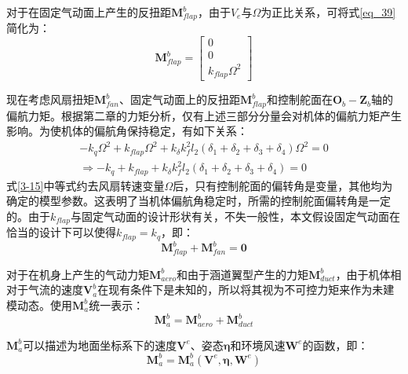 对于在固定气动面上产生的反扭距$\boldsymbol{M}_{flap}^b$，由于$V_{e}$与$\Omega$为正比关系，可将式\ref{eq_39}简化为：
\begin{equation}
    \boldsymbol{M}_{flap}^b=
    \begin{bmatrix}
    0 \\0 \\k_{flap}\Omega^2
    \end{bmatrix}
    \label{3-15}
\end{equation}

现在考虑风扇扭矩$\boldsymbol{M}_{fan}^b$、固定气动面上的反扭距$\boldsymbol{M}_{flap}^b$和控制舵面在$\boldsymbol{O}_b-\boldsymbol{Z}_b$轴的偏航力矩。根据第二章的力矩分析，仅有上述三部分分量会对机体的偏航力矩产生影响。为使机体的偏航角保持稳定，有如下关系：
\begin{equation}
    \begin{gathered}
    -k_q\Omega^2+k_{flap}\Omega^2+k_{\delta}k_f^2 l_2(\delta_1 + \delta_2 + \delta_3 + \delta_4)\Omega^2=0
     \\
     \Rightarrow
    -k_q+k_{flap}+k_{\delta}k_f^2 l_2(\delta_1 + \delta_2 + \delta_3 + \delta_4)=0
    \end{gathered}
    \label{3-16}
\end{equation}
式\ref{3-15}中等式约去风扇转速变量$\Omega$后，只有控制舵面的偏转角是变量，其他均为确定的模型参数。这表明了当机体偏航角稳定时，所需的控制舵面偏转角是一定的。由于$k_{flap}$与固定气动面的设计形状有关，不失一般性，本文假设固定气动面在恰当的设计下可以使得$k_{flap}=k_{q}$，即：
\begin{equation}
    \boldsymbol{M}_{flap}^b + \boldsymbol{M}_{fan}^b = \boldsymbol{0}
\label{3-17}
\end{equation}

对于在机身上产生的气动力矩$\boldsymbol{M}_{aero}^b$和由于涵道翼型产生的力矩$\boldsymbol{M}_{duct}^b$，由于机体相对于气流的速度$\boldsymbol{V}_a^b$在现有条件下是未知的，所以将其视为不可控力矩来作为未建模动态。使用$\boldsymbol{M}_{a}^b$统一表示：
\begin{equation}
    \boldsymbol{M}_{a}^b=\boldsymbol{M}_{aero}^b+\boldsymbol{M}_{duct}^b
    \label{3-18}
\end{equation}

$\boldsymbol{M}_{a}^b$可以描述为地面坐标系下的速度$\boldsymbol{V}^e$、姿态$\boldsymbol{\eta}$和环境风速$\boldsymbol{W}^e$的函数，即：
\begin{equation}
    \boldsymbol{M}_{a}^b=\boldsymbol{M}_{a}^b(\boldsymbol{V}^e,\boldsymbol{\eta},\boldsymbol{W}^e)
    \label{3-19}
\end{equation}

